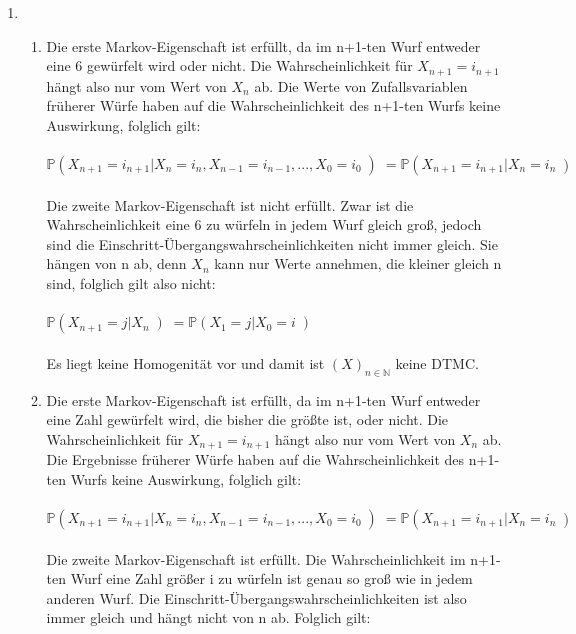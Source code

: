 \documentclass[a4paper]{scrartcl}
\begin{document}
\begin{enumerate}[label=\bfseries 1.\arabic*]
    \item
        \begin{enumerate}[label=\alph*)]
            \item Die erste Markov-Eigenschaft ist erfüllt, da im n+1-ten  Wurf entweder eine 6 gewürfelt wird oder nicht. Die Wahrscheinlichkeit für $ X_{n+1} = i_{n+1} $ hängt also nur vom Wert von $ X_{n} $  ab. Die Werte von Zufallsvariablen früherer Würfe haben auf die Wahrscheinlichkeit des n+1-ten Wurfs  keine Auswirkung, folglich gilt:\\\\
            $ \mathbb{P} \left( X_{n+1}=i_{n+1}|X_{n}=i_{n},X_{n-1}=i_{n-1},...,X_{0}=i_{0}\left) = \mathbb{P} \left( X_{n+1}=i_{n+1}|X_{n}=i_{n} \left) $\\\\
            Die zweite Markov-Eigenschaft ist nicht erfüllt. Zwar ist die Wahrscheinlichkeit eine 6 zu würfeln in jedem Wurf gleich groß, jedoch sind die Einschritt-Übergangswahrscheinlichkeiten nicht immer gleich. Sie hängen von n ab, denn $ X_{n} $ kann nur Werte annehmen, die kleiner gleich n sind, folglich gilt also nicht:\\\\
            $ \mathbb{P} \left( X_{n+1}=j | X_{n} \left) = \mathbb{P} \left( X_{1} = j | X_{0} = i \left)$ \\\\
            Es liegt keine Homogenität vor und damit ist $ (X)_{n\in\mathbb{N}} $ keine DTMC. 
            \item Die erste Markov-Eigenschaft ist erfüllt, da im n+1-ten  Wurf entweder eine Zahl gewürfelt wird, die bisher die größte ist, oder nicht. Die Wahrscheinlichkeit für $ X_{n+1} = i_{n+1} $ hängt also nur vom Wert von $ X_{n} $ ab. Die Ergebnisse früherer Würfe haben auf die Wahrscheinlichkeit des n+1-ten Wurfs  keine Auswirkung, folglich gilt:\\\\
            $ \mathbb{P} \left( X_{n+1}=i_{n+1}|X_{n}=i_{n},X_{n-1}=i_{n-1},...,X_{0}=i_{0}\left) = \mathbb{P} \left( X_{n+1}=i_{n+1}|X_{n}=i_{n} \left) $\\\\
            Die zweite Markov-Eigenschaft ist erfüllt. Die Wahrscheinlichkeit im n+1-ten Wurf eine Zahl größer i zu würfeln ist genau so groß wie in jedem anderen Wurf. Die Einschritt-Übergangswahrscheinlichkeiten ist also immer gleich und hängt nicht von n ab. Folglich gilt:\\\\

\end{enumerate}
\end{enumerate}
\end{document}
